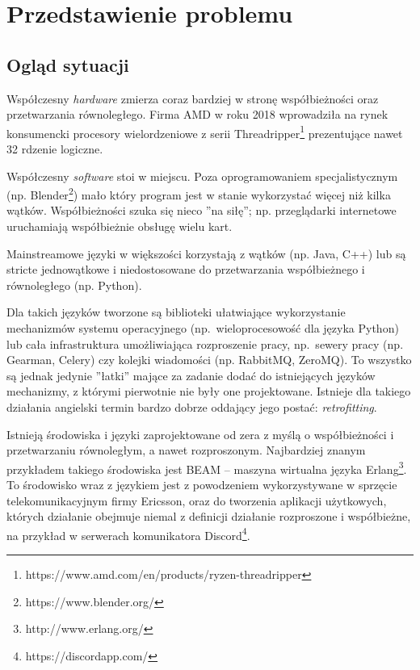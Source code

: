 \documentclass[11pt,oneside,a4paper,titlepage,onecolumn]{book}
\begin{document}
\section{Przedstawienie problemu}


\subsection{Ogląd sytuacji}

Współczesny \emph{hardware} zmierza coraz bardziej w stronę współbieżności oraz przetwarzania równoległego.
Firma AMD w roku 2018 wprowadziła na rynek konsumencki procesory wielordzeniowe z serii
Threadripper\footnote{https://www.amd.com/en/products/ryzen-threadripper} prezentujące nawet 32 rdzenie logiczne.

Współczesny \emph{software} stoi w miejscu. Poza oprogramowaniem specjalistycznym (np.
Blender\footnote{https://www.blender.org/}) mało który program jest w stanie wykorzystać więcej niż kilka wątków.
Współbieżności szuka się nieco ''na siłę''; np. przeglądarki internetowe uruchamiają współbieżnie obsługę
wielu kart.

Mainstreamowe języki w większości korzystają z wątków (np. Java, C++) lub są stricte jednowątkowe i
niedostosowane do przetwarzania współbieżnego i równoległego (np. Python).

Dla takich języków tworzone są biblioteki ułatwiające wykorzystanie mechanizmów systemu operacyjnego
(np.~wieloprocesowość dla języka Python) lub cała infrastruktura umożliwiająca rozproszenie pracy,
np.~sewery pracy (np. Gearman, Celery) czy kolejki wiadomości (np. RabbitMQ, ZeroMQ).
To wszystko są jednak jedynie ''łatki'' mające za zadanie dodać do istniejących języków mechanizmy, z którymi
pierwotnie nie były one projektowane. Istnieje dla takiego działania angielski termin bardzo dobrze oddający
jego postać: \emph{retrofitting}.

Istnieją środowiska i języki zaprojektowane od zera z myślą o współbieżności i przetwarzaniu równoległym, a
nawet rozproszonym.
Najbardziej znanym przykładem takiego środowiska jest BEAM -- maszyna wirtualna
języka Erlang\footnote{http://www.erlang.org/}. To środowisko wraz z językiem jest z powodzeniem
wykorzystywane w sprzęcie telekomunikacyjnym firmy Ericsson, oraz do tworzenia aplikacji użytkowych, których
działanie obejmuje niemal z definicji działanie rozproszone i współbieżne, na przykład w serwerach
komunikatora Discord\footnote{https://discordapp.com/}.
\end{document}
